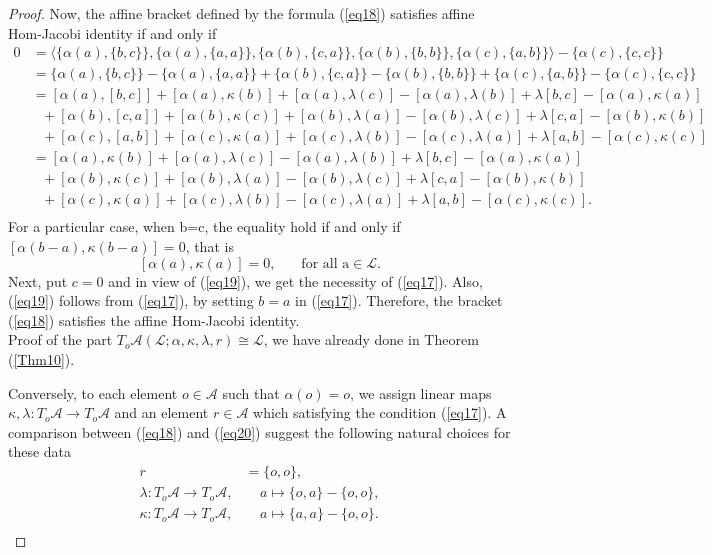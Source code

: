 \documentclass[10pt,a4paper]{amsart}
\begin{document}
\begin{proof}
Now, the affine bracket defined by the formula (\ref{eq18}) satisfies affine Hom-Jacobi identity if and only if
\begin{align*}
0&=\langle\{\alpha(a),\{b,c\}\},\{\alpha( a),\{a,a\}\},\{\alpha(b),\{c,a\}\},\{\alpha(b),\{b,b\}\},\{\alpha(c),\{a,b\}\}\rangle-\{\alpha(c),\{c,c\}\}\\
&=\{\alpha(a),\{b,c\}\}-\{\alpha( a),\{a,a\}\}+\{\alpha(b),\{c,a\}\}-\{\alpha(b),\{b,b\}\}+\{\alpha(c),\{a,b\}\}-\{\alpha(c),\{c,c\}\}\\
&=[\alpha(a),[b,c]]+[\alpha(a),\kappa(b)]+[\alpha(a),\lambda(c)]-[\alpha(a),\lambda(b)]+\lambda[b,c]-[\alpha(a),\kappa(a)]\\
&~~~+[\alpha(b),[c,a]]+[\alpha(b),\kappa(c)]+[\alpha(b),\lambda(a)]-[\alpha(b),\lambda(c)]+\lambda[c,a]-[\alpha(b),\kappa(b)]\\
&~~~+[\alpha(c),[a,b]]+[\alpha(c),\kappa(a)]+[\alpha(c),\lambda(b)]-[\alpha(c),\lambda(a)]+\lambda[a,b]-[\alpha(c),\kappa(c)]\\
&=[\alpha(a),\kappa(b)]+[\alpha(a),\lambda(c)]-[\alpha(a),\lambda(b)]+\lambda[b,c]-[\alpha(a),\kappa(a)]\\
&~~~+[\alpha(b),\kappa(c)]+[\alpha(b),\lambda(a)]-[\alpha(b),\lambda(c)]+\lambda[c,a]-[\alpha(b),\kappa(b)]\\
&~~~+[\alpha(c),\kappa(a)]+[\alpha(c),\lambda(b)]-[\alpha(c),\lambda(a)]+\lambda[a,b]-[\alpha(c),\kappa(c)].\\
\end{align*}
For a particular case, when b=c, the equality hold if and only if $[\alpha(b-a),\kappa(b-a)]=0$, that is
\begin{equation}\label{eq19}
[\alpha(a),\kappa(a)]=0,~~~~~~~~\text{for all a} \in \mathcal{L}.
\end{equation}
Next, put $c=0$ and in view of (\ref{eq19}), we get the necessity of (\ref{eq17}). Also, (\ref{eq19}) follows from (\ref{eq17}), by setting $b=a$ in (\ref{eq17}). Therefore, the bracket (\ref{eq18}) satisfies the affine Hom-Jacobi identity.\\
Proof of the part $T_{o}\mathcal{A}(\mathcal{L};\alpha,\kappa,\lambda,r)\cong\mathcal{L}$, we have already done in Theorem (\ref{Thm10}).

Conversely, to each element $o\in \mathcal{A}$ such that $\alpha(o)=o$, we assign linear maps $\kappa,\lambda:T_{o}\mathcal{A}\rightarrow T_{o}\mathcal{A}$ and an element $r\in \mathcal{A}$ which satisfying the condition (\ref{eq17}). A comparison between (\ref{eq18}) and (\ref{eq20}) suggest the following natural choices for these data
\begin{align*}
r&=\{o,o\},\\
\lambda:T_{o}\mathcal{A}\rightarrow T_{o}\mathcal{A},&~~~~~a\mapsto\{o,a\}-\{o,o\},\\
\kappa:T_{o}\mathcal{A}\rightarrow T_{o}\mathcal{A},&~~~~~a\mapsto\{a,a\}-\{o,o\}.\\
\end{align*}


\end{proof}
\end{document}
